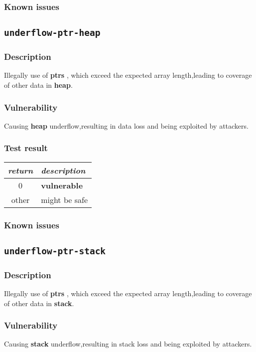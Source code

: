\documentclass[a4paper]{book}
\begin{document}
\subsubsection{Known issues}
\newpage


\subsection{\texttt{underflow-ptr-heap}}\label{test-underflow-ptr-heap}
\subsubsection{Description}
Illegally use of \textbf{ptrs} , which exceed the expected array length,leading to coverage of other data in \textbf{heap}.
\subsubsection{Vulnerability}
Causing \textbf{heap} underflow,resulting in data loss and being exploited by attackers.
\subsubsection{Test result}
\begin{tabular}{cl}
  \toprule
  \emph{return}  & \emph{description} \\
  \midrule
  0              & \textbf{vulnerable} \\
  other          & might be safe \\
  \bottomrule
\end{tabular}
\subsubsection{Known issues}
\newpage


\subsection{\texttt{underflow-ptr-stack}}\label{test-underflow-ptr-stack}
\subsubsection{Description}
Illegally use of \textbf{ptrs} , which exceed the expected array length,leading to coverage of other data in \textbf{stack}.\subsubsection{Vulnerability}
Causing \textbf{stack} underflow,resulting in stack loss and being exploited by attackers.
\end{document}
